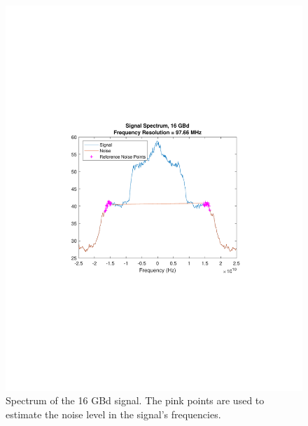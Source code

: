 \begin{refsection}
\begin{figure}[H]
\begin{minipage}{0.43\textwidth}
	\end{minipage}
	\begin{minipage}{0.43\textwidth}
		\centering
		\includegraphics[clip, trim=4cm 8cm 4cm 8cm, 
		width=1\textwidth]{./sdf/m_qam_system/figures/snr/minMaxSpec/16GBdMaxSpecHSNR.pdf}
		\subcaption{\label{fig:snrMaxFreq_16_10_500}}
	\end{minipage}
	\caption{Spectrum of the 16 GBd signal. The pink points are used to 
	estimate the noise level in the signal's 
	frequencies.\label{fig:snrSpec_16_10_500}}
\end{figure}

\begin{figure}[H]
	\centering
	

\end{figure}
\end{refsection}
